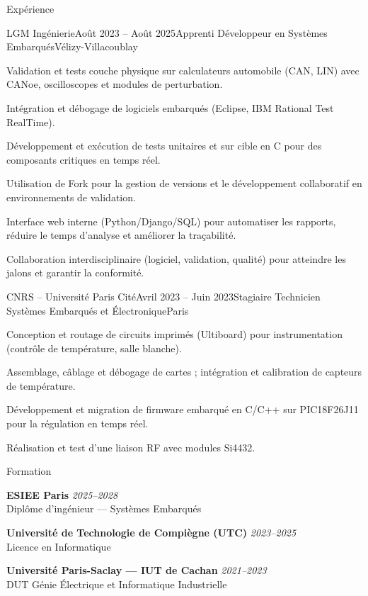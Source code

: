 \documentclass[10pt]{style}
\begin{document}
\begin{rSection}{Expérience}

  \begin{rSubsection}{LGM Ingénierie}{Août 2023 -- Août 2025}{Apprenti Développeur en Systèmes Embarqués}{Vélizy-Villacoublay}
    \item Validation et tests couche physique sur calculateurs automobile (CAN, LIN) avec CANoe, oscilloscopes et modules de perturbation.
    \item Intégration et débogage de logiciels embarqués (Eclipse, IBM Rational Test RealTime).
    \item Développement et exécution de tests unitaires et sur cible en C pour des composants critiques en temps réel.
    \item Utilisation de Fork pour la gestion de versions et le développement collaboratif en environnements de validation.
    \item Interface web interne (Python/Django/SQL) pour automatiser les rapports, réduire le temps d’analyse et améliorer la traçabilité.
    \item Collaboration interdisciplinaire (logiciel, validation, qualité) pour atteindre les jalons et garantir la conformité.
  \end{rSubsection}

  \begin{rSubsection}{CNRS -- Université Paris Cité}{Avril 2023 -- Juin 2023}{Stagiaire Technicien Systèmes Embarqués et Électronique}{Paris}
    \item Conception et routage de circuits imprimés (Ultiboard) pour instrumentation (contrôle de température, salle blanche).
    \item Assemblage, câblage et débogage de cartes ; intégration et calibration de capteurs de température.
    \item Développement et migration de firmware embarqué en C/C++ sur PIC18F26J11 pour la régulation en temps réel.
    \item Réalisation et test d’une liaison RF avec modules Si4432.
  \end{rSubsection}

\end{rSection}


\begin{rSection}{Formation}

  \textbf{ESIEE Paris} \hfill \textit{2025--2028} \\
  Diplôme d’ingénieur — Systèmes Embarqués

  \textbf{Université de Technologie de Compiègne (UTC)} \hfill \textit{2023--2025} \\
  Licence en Informatique

  \textbf{Université Paris-Saclay — IUT de Cachan} \hfill \textit{2021--2023} \\
  DUT Génie Électrique et Informatique Industrielle

\end{rSection}
\end{document}
